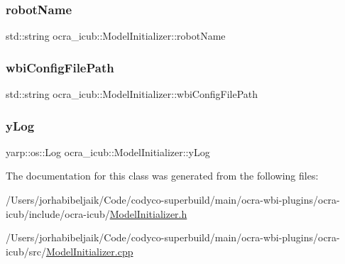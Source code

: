 \hypertarget{classocra__icub_1_1ModelInitializer_aef3121c44b93b22cf24c4ccbbc477128}{}\label{classocra__icub_1_1ModelInitializer_aef3121c44b93b22cf24c4ccbbc477128} 
\subsubsection{\texorpdfstring{robot\+Name}{robotName}}
{\footnotesize\ttfamily std\+::string ocra\+\_\+icub\+::\+Model\+Initializer\+::robot\+Name\hspace{0.3cm}{\ttfamily [private]}}

\hypertarget{classocra__icub_1_1ModelInitializer_add617233dd3940f79f03cb6a2ed6adb5}{}\label{classocra__icub_1_1ModelInitializer_add617233dd3940f79f03cb6a2ed6adb5} 
\subsubsection{\texorpdfstring{wbi\+Config\+File\+Path}{wbiConfigFilePath}}
{\footnotesize\ttfamily std\+::string ocra\+\_\+icub\+::\+Model\+Initializer\+::wbi\+Config\+File\+Path\hspace{0.3cm}{\ttfamily [private]}}

\hypertarget{classocra__icub_1_1ModelInitializer_a7ecf8156a05245831e51cc212eec5985}{}\label{classocra__icub_1_1ModelInitializer_a7ecf8156a05245831e51cc212eec5985} 
\subsubsection{\texorpdfstring{y\+Log}{yLog}}
{\footnotesize\ttfamily yarp\+::os\+::\+Log ocra\+\_\+icub\+::\+Model\+Initializer\+::y\+Log\hspace{0.3cm}{\ttfamily [private]}}



The documentation for this class was generated from the following files\+:\begin{DoxyCompactItemize}
\item 
/\+Users/jorhabibeljaik/\+Code/codyco-\/superbuild/main/ocra-\/wbi-\/plugins/ocra-\/icub/include/ocra-\/icub/\hyperlink{ModelInitializer_8h}{Model\+Initializer.\+h}\item 
/\+Users/jorhabibeljaik/\+Code/codyco-\/superbuild/main/ocra-\/wbi-\/plugins/ocra-\/icub/src/\hyperlink{ModelInitializer_8cpp}{Model\+Initializer.\+cpp}\end{DoxyCompactItemize}
